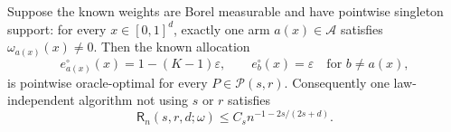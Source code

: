 Suppose the known weights are Borel measurable and have pointwise singleton support: for every \(x\in[0,1]^d\), exactly one arm \(a(x)\in\mathcal A\) satisfies \(\omega_{a(x)}(x)\neq0\). Then the known allocation
\[
e_{a(x)}^{\circ}(x)=1-(K-1)\varepsilon,
\qquad
e_b^{\circ}(x)=\varepsilon\quad\text{for }b\neq a(x),
\]
is pointwise oracle-optimal for every \(P\in\mathcal P(s,r)\). Consequently one law-independent algorithm not using \(s\) or \(r\) satisfies
\[
\mathsf R_n(s,r,d;\omega)
\leq C_s n^{-1-2s/(2s+d)}.
\]